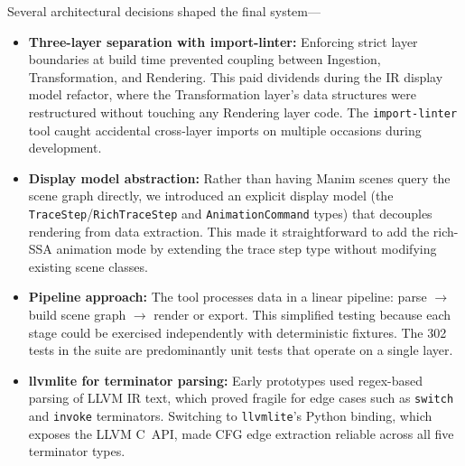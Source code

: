 Several architectural decisions shaped the final system---
\begin{itemize}
  \item \textbf{Three-layer separation with import-linter:} Enforcing strict layer boundaries at build time prevented coupling between Ingestion, Transformation, and Rendering. This paid dividends during the IR display model refactor, where the Transformation layer's data structures were restructured without touching any Rendering layer code. The \texttt{import-linter} tool caught accidental cross-layer imports on multiple occasions during development.

  \item \textbf{Display model abstraction:} Rather than having Manim scenes query the scene graph directly, we introduced an explicit display model (the \texttt{Trace\-Step}/\texttt{Rich\-Trace\-Step} and \texttt{Animation\-Command} types) that decouples rendering from data extraction. This made it straightforward to add the rich-SSA animation mode by extending the trace step type without modifying existing scene classes.

  \item \textbf{Pipeline approach:} The tool processes data in a linear pipeline: parse $\rightarrow$ build scene graph $\rightarrow$ render or export. This simplified testing because each stage could be exercised independently with deterministic fixtures. The 302 tests in the suite are predominantly unit tests that operate on a single layer.

  \item \textbf{llvmlite for terminator parsing:} Early prototypes used regex-based parsing of LLVM IR text, which proved fragile for edge cases such as \texttt{switch} and \texttt{invoke} terminators. Switching to \texttt{llvmlite}'s Python binding, which exposes the LLVM C~API, made CFG edge extraction reliable across all five terminator types.
\end{itemize}

